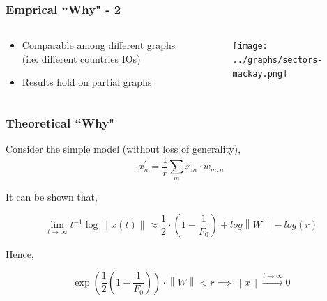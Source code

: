 \documentclass{beamer}
\newcommand{\norm}[1]{\left\lVert#1\right\rVert}
\begin{document}
\begin{frame}
    \frametitle{Emprical ``Why" - 2}
    \begin{columns}
        \begin{column}{.3\textwidth}
            \begin{itemize}
                \item Comparable among different graphs (i.e. different countries IOs)
                \item Results hold on partial graphs
            \end{itemize}
        \end{column}
        \begin{column}{.69\textwidth}
            \begin{figure}
                \texttt{[image: ../graphs/sectors-mackay.png]}
            \end{figure}
        \end{column}
    \end{columns}
\end{frame}

\begin{frame}
    \frametitle{Theoretical ``Why"}
    Consider the simple model (without loss of generality),
    \begin{equation*}
        x_n^\prime =\frac{1}{r} \sum_{m} x_m\cdot w_{m, n}
    \end{equation*}

    It can be shown that,

    \begin{equation*}
        \lim_{t \xrightarrow{} \infty} t^{-1} \log \norm{x(t)} \approx\frac{1}{2} \cdot \left( 1 - \frac{1}{F_0}\right) + log \norm{W} - log(r)
    \end{equation*}

    Hence,

    \begin{equation}
        \exp\left(\frac{1}{2} \left( 1 - \frac{1}{F_0}\right) \right) \cdot \norm{W} < r \implies \norm{x} \xrightarrow{t\xrightarrow{} \infty} 0
    \end{equation}

\end{frame}
\end{document}
